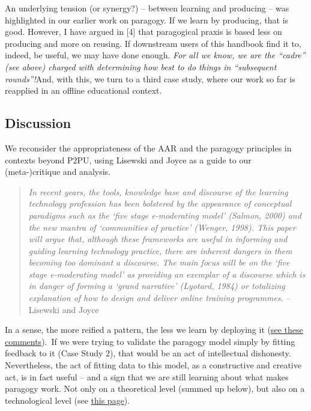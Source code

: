 An underlying tension (or synergy?) -- between learning and producing --
was highlighted in our earlier work on paragogy. If we learn by
producing, that is good. However, I have argued in {[}4{]} that
paragogical praxis is based less on producing and more on reusing. If
downstream users of this handbook find it to, indeed, be useful, we may
have done enough. \emph{For all we know, we are the ``cadre'' (see
above) charged with determining how best to do things in ``subsequent
rounds''!}And, with this, we turn to a third case study, where our work
so far is reapplied in an offline educational context.

\subsection{Discussion}

We reconsider the appropriateness of the AAR and the paragogy principles
in contexts beyond P2PU, using Lisewski and Joyce as a guide to our
(meta-)critique and analysis.

\begin{quote}
\emph{In recent years, the tools, knowledge base and discourse of the
learning technology profession has been bolstered by the appearance of
conceptual paradigms such as the `five stage e-moderating model'
(Salmon, 2000) and the new mantra of `communities of practice' (Wenger,
1998). This paper will argue that, although these frameworks are useful
in informing and guiding learning technology practice, there are
inherent dangers in them becoming too dominant a discourse. The main
focus will be on the `five stage e-moderating model' as providing an
exemplar of a discourse which is in danger of forming a `grand
narrative' (Lyotard, 1984) or totalizing explanation of how to design
and deliver online training programmes.} -- Lisewski and Joyce
\end{quote}

In a sense, the more reified a pattern, the less we learn by deploying
it
(\href{http://socialmediaclassroom.com/host/peeragogy/forum/anti-patterns-concerns-complaints-and-critiques\#comment-2355}{see
these comments}).~If we were trying to validate the paragogy model
simply by fitting feedback to it (Case Study 2), that would be an act of
intellectual dishonesty. Nevertheless, the act of fitting data to this
model, as a constructive and creative act, is in fact useful -- and a
sign that we are still learning about what makes paragogy work. Not only
on a theoretical level (summed up below), but also on a technological
level (see
\href{http://socialmediaclassroom.com/host/peeragogy/wiki/researching-p\%C3\%A6ragogy}{this
page}).

